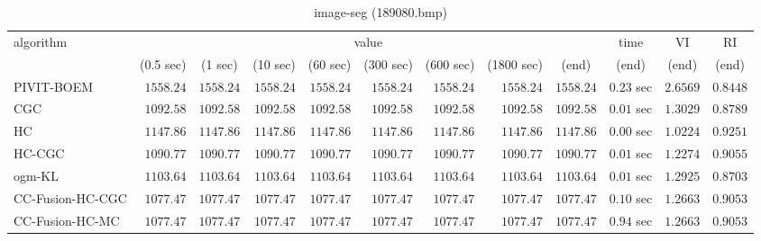 \begin{table}[H]
\scriptsize
\centering
\caption{image-seg (189080.bmp)}
\label{tab:anytimetable-image-seg-189080.bmp}
\begin{tabular}{lrrrrrrrrrrr}
\toprule
           algorithm &                                   \multicolumn{8}{c}{value} & \multicolumn{1}{c}{time}    & \multicolumn{1}{c}{VI}  & \multicolumn{1}{c}{RI} \\  
\cmidrule(lr){2-9}\cmidrule(lr){10-10} \cmidrule(lr){11-11} \cmidrule(lr){12-12}   
                     & \multicolumn{1}{c}{(0.5 sec)} & \multicolumn{1}{c}{(1 sec)} & \multicolumn{1}{c}{(10 sec)} & \multicolumn{1}{c}{(60 sec)} & \multicolumn{1}{c}{(300 sec)} & \multicolumn{1}{c}{(600 sec)} & \multicolumn{1}{c}{(1800 sec)} & \multicolumn{1}{c}{(end)} & \multicolumn{1}{c}{(end)}    & \multicolumn{1}{c}{(end)}   & \multicolumn{1}{c}{(end)}  \\ \midrule 
          PIVIT-BOEM & $      1558.24$ & $      1558.24$ & $      1558.24$ & $      1558.24$ & $      1558.24$ & $      1558.24$ & $      1558.24$ & $      1558.24$ & $         0.23$ sec    & $       2.6569$  & $       0.8448$ \\ 
                 CGC & $      1092.58$ & $      1092.58$ & $      1092.58$ & $      1092.58$ & $      1092.58$ & $      1092.58$ & $      1092.58$ & $      1092.58$ & $         0.01$ sec    & $       1.3029$  & $       0.8789$ \\ 
                  HC & $      1147.86$ & $      1147.86$ & $      1147.86$ & $      1147.86$ & $      1147.86$ & $      1147.86$ & $      1147.86$ & $      1147.86$ & $         0.00$ sec    & $       1.0224$  & $       0.9251$ \\ 
              HC-CGC & $      1090.77$ & $      1090.77$ & $      1090.77$ & $      1090.77$ & $      1090.77$ & $      1090.77$ & $      1090.77$ & $      1090.77$ & $         0.01$ sec    & $       1.2274$  & $       0.9055$ \\ 
              ogm-KL & $      1103.64$ & $      1103.64$ & $      1103.64$ & $      1103.64$ & $      1103.64$ & $      1103.64$ & $      1103.64$ & $      1103.64$ & $         0.01$ sec    & $       1.2925$  & $       0.8703$ \\ 
    CC-Fusion-HC-CGC & $      1077.47$ & $      1077.47$ & $      1077.47$ & $      1077.47$ & $      1077.47$ & $      1077.47$ & $      1077.47$ & $      1077.47$ & $         0.10$ sec    & $       1.2663$  & $       0.9053$ \\ 
     CC-Fusion-HC-MC & $      1077.47$ & $      1077.47$ & $      1077.47$ & $      1077.47$ & $      1077.47$ & $      1077.47$ & $      1077.47$ & $      1077.47$ & $         0.94$ sec    & $       1.2663$  & $       0.9053$ \\ 

\end{tabular}
\end{table}
